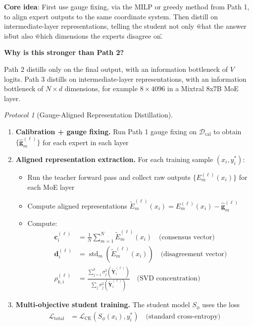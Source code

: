 \documentclass[12pt,a4paper]{article}
\theoremstyle{remark}
\newtheorem{protocol}[theorem]{Protocol}
\newcommand{\D}{\mathcal{D}}
\begin{document}
\textbf{Core idea}: First use gauge fixing, via the MILP or greedy method from Path 1, to align expert outputs to the same coordinate system. Then distill on intermediate-layer representations, telling the student not only \"what the answer is\" but also \"which dimensions the experts disagree on\".

\textbf{Why is this stronger than Path 2?}

Path 2 distills only on the final output, with an information bottleneck of $V$ logits. Path 3 distills on intermediate-layer representations, with an information bottleneck of $N \times d$ dimensions, for example $8 \times 4096$ in a Mixtral 8x7B MoE layer.

\begin{protocol}[Gauge-Aligned Representation Distillation]
\label{prot:rep_distill}
\begin{enumerate}
    \item \textbf{Calibration + gauge fixing.} Run Path 1 gauge fixing on $\D_{\text{cal}}$ to obtain $\{\hat{\mathbf{g}}_m^{(\ell)}\}$ for each expert in each layer
    \item \textbf{Aligned representation extraction.} For each training sample $(x_i, y_i^*)$:
    \begin{itemize}
        \item Run the teacher forward pass and collect raw outputs $\{E_m^{(\ell)}(x_i)\}$ for each MoE layer
        \item Compute aligned representations $\tilde{E}_m^{(\ell)}(x_i) = E_m^{(\ell)}(x_i) - \hat{\mathbf{g}}_m^{(\ell)}$
        \item Compute:
        \begin{align}
            \mathbf{c}_i^{(\ell)} &= \frac{1}{N} \sum_{m=1}^{N} \tilde{E}_m^{(\ell)}(x_i) \quad \text{(consensus vector)} \\
            \mathbf{d}_i^{(\ell)} &= \operatorname{std}_m(\tilde{E}_m^{(\ell)}(x_i)) \quad \text{(disagreement vector)} \\
            \rho_{k,i}^{(\ell)} &= \frac{\sum_{j=1}^{k} \sigma_j^2(\tilde{\mathbf{Y}}_i^{(\ell)})}{\sum_j \sigma_j^2(\tilde{\mathbf{Y}}_i^{(\ell)})} \quad \text{(SVD concentration)}
        \end{align}
    \end{itemize}
    \item \textbf{Multi-objective student training.} The student model $S_\phi$ uses the loss
    \begin{align}
        \mathcal{L}_{\text{total}} &= \mathcal{L}_{\text{CE}}(S_\phi(x_i), y_i^*) \quad \text{(standard cross-entropy)} \\

\end{align}
\end{enumerate}
\end{protocol}
\end{document}
